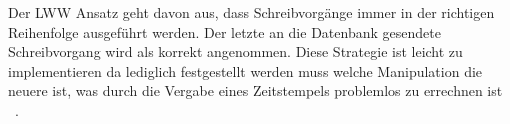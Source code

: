 Der \gls{LWW} Ansatz geht davon aus, dass Schreibvorgänge immer in der richtigen Reihenfolge ausgeführt werden. Der letzte an die Datenbank gesendete Schreibvorgang wird als korrekt angenommen.
Diese Strategie ist leicht zu implementieren da lediglich festgestellt werden muss welche Manipulation die neuere ist, was durch die Vergabe eines Zeitstempels problemlos zu errechnen ist ~\cite{lww}.\\

